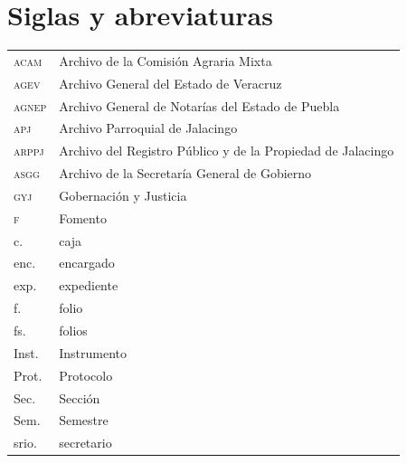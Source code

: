 \documentclass[14pt,twoside,final]{extbook} %
\begin{document}
\chapter*{Siglas y abreviaturas}
\label{ch:siglas-y-abreviaturas}
\pagestyle{empty}
\thispagestyle{empty}
\pagestyle{fancy}
\fancyhf{} %
\fancyhead[RO,LE]{\thepage}
\renewcommand{\headrulewidth}{0pt}
\begin{table}[H]
\centering
\begin{tabular}{@{}ll@{}}
\textsc{acam} & Archivo de la Comisión Agraria Mixta \\
\textsc{agev} & Archivo General del Estado de Veracruz \\
\textsc{agnep} & Archivo General de Notarías del Estado de Puebla \\
\textsc{apj} & Archivo Parroquial de Jalacingo \\
\textsc{arppj} & Archivo del Registro Público y de la Propiedad de Jalacingo \\
\textsc{asgg} & Archivo de la Secretaría General de Gobierno \\
\textsc{gyj} & Gobernación y Justicia \\
\textsc{f} & Fomento \\
c. & caja \\
enc. & encargado \\
exp. & expediente \\
f. & folio \\
fs. & folios \\
Inst. & Instrumento \\
Prot. & Protocolo \\
Sec. & Sección \\
Sem. & Semestre \\
srio. & secretario \\
\end{tabular}
\label{tab:siglas-y-abreviaturas}
\end{table}
\end{document}
